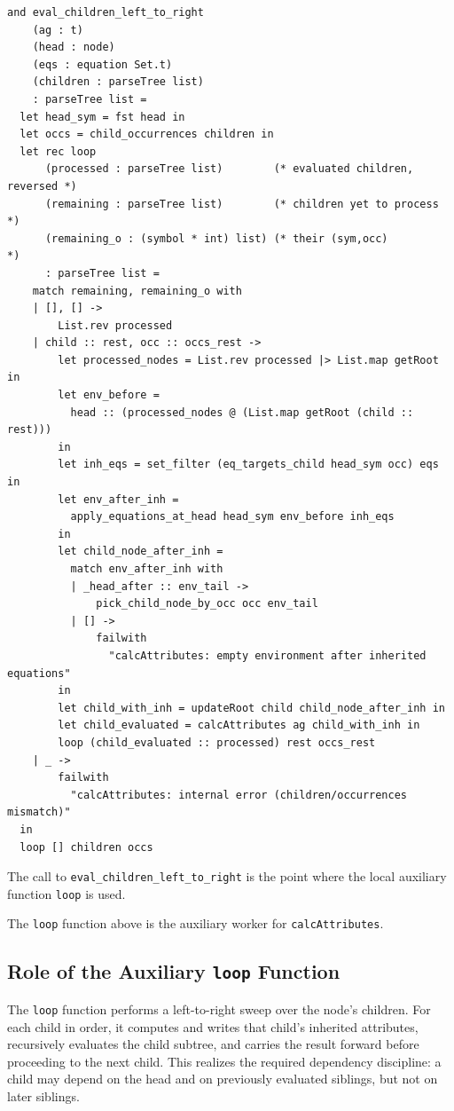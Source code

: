 \begin{verbatim}
and eval_children_left_to_right
    (ag : t)
    (head : node)
    (eqs : equation Set.t)
    (children : parseTree list)
    : parseTree list =
  let head_sym = fst head in
  let occs = child_occurrences children in
  let rec loop
      (processed : parseTree list)        (* evaluated children, reversed *)
      (remaining : parseTree list)        (* children yet to process     *)
      (remaining_o : (symbol * int) list) (* their (sym,occ)             *)
      : parseTree list =
    match remaining, remaining_o with
    | [], [] ->
        List.rev processed
    | child :: rest, occ :: occs_rest ->
        let processed_nodes = List.rev processed |> List.map getRoot in
        let env_before =
          head :: (processed_nodes @ (List.map getRoot (child :: rest)))
        in
        let inh_eqs = set_filter (eq_targets_child head_sym occ) eqs in
        let env_after_inh =
          apply_equations_at_head head_sym env_before inh_eqs
        in
        let child_node_after_inh =
          match env_after_inh with
          | _head_after :: env_tail ->
              pick_child_node_by_occ occ env_tail
          | [] ->
              failwith
                "calcAttributes: empty environment after inherited equations"
        in
        let child_with_inh = updateRoot child child_node_after_inh in
        let child_evaluated = calcAttributes ag child_with_inh in
        loop (child_evaluated :: processed) rest occs_rest
    | _ ->
        failwith
          "calcAttributes: internal error (children/occurrences mismatch)"
  in
  loop [] children occs
\end{verbatim}

The call to \texttt{eval\_children\_left\_to\_right} is the point where the local auxiliary function \texttt{loop} is used. 

The \texttt{loop} function above is the auxiliary worker for \texttt{calcAttributes}. 

\subsection{Role of the Auxiliary \texttt{loop} Function}
The \texttt{loop} function performs a left-to-right sweep over the node's children. For each child in order, it computes and writes that child's inherited 
attributes, recursively evaluates the child subtree, and carries the result forward before proceeding to the next child. 
This realizes the required dependency discipline: a child may depend on the head and on previously evaluated siblings, but not on later siblings. 

